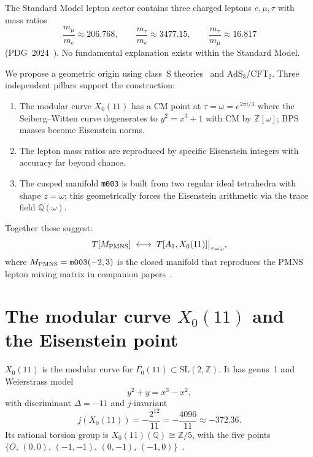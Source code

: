 \documentclass[11pt,a4paper]{article}
\theoremstyle{remark}
\newcommand{\mfld}[1]{\texttt{#1}}
\newcommand{\Z}{\mathbb{Z}}
\newcommand{\Q}{\mathbb{Q}}
\begin{document}
The Standard Model lepton sector contains three charged leptons
$e,\mu,\tau$ with mass ratios
\begin{equation}
\frac{m_\mu}{m_e}\approx 206.768,\qquad
\frac{m_\tau}{m_e}\approx 3477.15,\qquad
\frac{m_\tau}{m_\mu}\approx 16.817
\end{equation}
(PDG~2024~\cite{PDG2024}).
No fundamental explanation exists within the Standard Model.

We propose a geometric origin using class~S theories~\cite{Gaiotto09}
and AdS$_3$/CFT$_2$.
Three independent pillars support the construction:
\begin{enumerate}
\item The modular curve $X_0(11)$ has a CM point at
  $\tau=\omega=e^{2\pi i/3}$ where the Seiberg--Witten curve degenerates
  to $y^2=x^3+1$ with CM by $\Z[\omega]$; BPS masses become Eisenstein norms.
\item The lepton mass ratios are reproduced by specific Eisenstein
  integers with accuracy far beyond chance.
\item The cusped manifold \mfld{m003} is built from two regular ideal
  tetrahedra with shape $z=\omega$; this geometrically forces the
  Eisenstein arithmetic via the trace field $\Q(\omega)$.
\end{enumerate}
Together these suggest:
\begin{equation}
T[M_{\rm PMNS}]\;\longleftrightarrow\;T[A_1,X_0(11)]\big|_{\tau=\omega},
\label{eq:conjecture}
\end{equation}
where $M_{\rm PMNS}=\mfld{m003}(-2,3)$ is the closed manifold
that reproduces the PMNS lepton mixing matrix in companion
papers~\cite{GentryPMNS,GentryUnified}.

\section{The modular curve $X_0(11)$ and the Eisenstein point}
\label{sec:X0}

$X_0(11)$ is the modular curve for $\Gamma_0(11)\subset\mathrm{SL}(2,\Z)$.
It has genus~1 and Weierstrass model
\begin{equation}
y^2+y=x^3-x^2,
\end{equation}
with discriminant $\Delta=-11$ and $j$-invariant
\begin{equation}
j(X_0(11))=-\frac{2^{12}}{11}=-\frac{4096}{11}\approx-372.36.
\end{equation}
Its rational torsion group is $X_0(11)(\Q)\cong\Z/5$, with the five points
$\{O,\,(0,0),\,(-1,-1),\,(0,-1),\,(-1,0)\}$~\cite{Silverman}.
\end{document}
